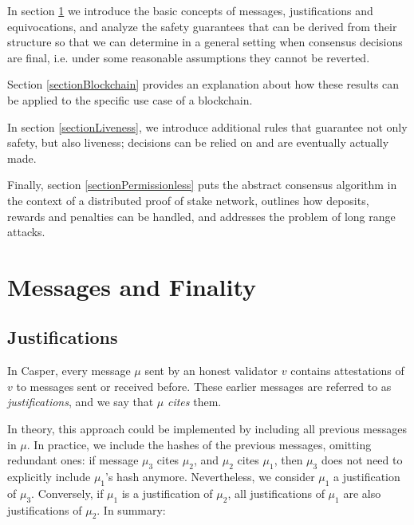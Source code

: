 \documentclass[12pt, fleqn]{article}
\begin{document}
In section \ref{sectionMessages} we introduce the basic concepts of messages, justifications and equivocations, and analyze the safety guarantees that can be derived from their structure so that we can determine in a general setting when consensus decisions are final, i.e. under some reasonable assumptions they cannot be reverted.

Section \ref{sectionBlockchain} provides an explanation about how these results can be applied to the specific use case of a blockchain.

In section \ref{sectionLiveness}, we introduce additional rules that guarantee not only safety, but also liveness; decisions can be relied on and are eventually actually made.

Finally, section \ref{sectionPermissionless} puts the abstract consensus algorithm in the context of a distributed proof of stake network, outlines how deposits, rewards and penalties can be handled, and addresses the problem of long range attacks.

\newpage


\section{Messages and Finality}
\label{sectionMessages}


\subsection{Justifications}

In Casper, every message $\mu$ sent by an honest validator $v$ contains attestations of $v$ to messages sent or received before. These earlier messages are referred to as \emph{justifications}, and we say that $\mu$ \emph{cites} them.

In theory, this approach could be implemented by including all previous messages in $\mu$. In practice, we include the hashes of the previous messages, omitting redundant ones: if message $\mu_3$ cites $\mu_2$, and $\mu_2$ cites $\mu_1$, then $\mu_3$ does not need to explicitly include $\mu_1$'s hash anymore. Nevertheless, we consider $\mu_1$ a justification of $\mu_3$. Conversely, if $\mu_1$ is a justification of $\mu_2$, all justifications of $\mu_1$ are also justifications of $\mu_2$.  In summary:
\end{document}
